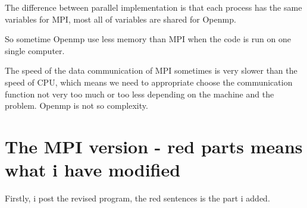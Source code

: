 \documentclass{article}
\begin{document}
The difference between parallel implementation is that each process has the same variables for MPI, most all of variables are shared for Openmp.

So sometime Openmp use less memory than MPI when the code is run on one single computer.

The speed of the data communication of MPI sometimes is very slower than the speed of CPU, which means we need to appropriate choose the communication function not very too much or too less
depending on the machine and the problem. Openmp is not so complexity.










\newpage

\section*{The MPI version - {red parts means what i have modified}}


Firstly,  i post the revised program,  the red sentences is the part i added.
\end{document}
